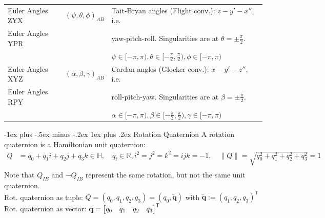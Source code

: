\documentclass[10pt,landscape,a4paper]{article}
\makeatletter
\renewcommand{\subsubsection}{\@startsection{subsubsection}{3}{0mm}%
                                {-1ex plus -.5ex minus -.2ex}%
                                {1ex plus .2ex}%
                                {\normalfont\small\bfseries}}
\newcommand\norm[1]{\lVert #1 \rVert}
\newcommand\transpose{\mathsf{T}}
\newcommand\imquatvec[1]{\check{\mathbf{#1}}}
\newcommand\Quat[2]{Q_{#1\!#2}}
\makeatother
\begin{document}
\begin{multicols}{2}
\begin{tabular}{ll@{}l@{}}
Euler Angles ZYX &  $(\psi, \theta, \phi)_{A\!B}$  & Tait-Bryan angles (Flight conv.): $z-y'-x''$, i.e.\   \\
Euler Angles YPR &  & yaw-pitch-roll. Singularities are at $\theta=\pm\frac{\pi}{2}$. \\
 &  & $\psi\in[-\pi,\pi), \theta\in[-\frac{\pi}{2},\frac{\pi}{2}), \phi\in[-\pi,\pi)$  \\  \hline
Euler Angles XYZ &  $(\alpha, \beta, \gamma)_{A\!B}$ & Cardan angles (Glocker conv.): $x-y'-z''$, i.e.\ \\
Euler Angles RPY & & roll-pitch-yaw. Singularities are at $\beta=\pm\frac{\pi}{2}$.  \\
 &  & $\alpha\in[-\pi,\pi), \beta\in[-\frac{\pi}{2},\frac{\pi}{2}), \gamma\in[-\pi,\pi)$  \\  \hline
\end{tabular} %

\subsubsection{Rotation Quaternion}
A rotation quaternion is a Hamiltonian unit quaternion: \\
$\begin{aligned}Q &= q_0 + q_1 i + q_2 j + q_3 k \in \mathbb{H}, \quad q_i \in \mathbb{R}, 
i^2 = j^2=k^2 = ijk = -1, \quad \norm{Q}= \sqrt{q_0^2 + q_1^2 + q_2^2 + q_3^2} = 1 \\
\end{aligned}$   \\
Note that $\Quat{I}{B}$ and $-\Quat{I}{B}$ represent the same rotation, but not the same unit quaternion. \\
Rot. quaternion as tuple: $Q = (q_0, q_1, q_2, q_3) = (q_0, \imquatvec{q})$ with $\imquatvec{q} := (q_1, q_2, q_3)^\transpose $ \\
Rot. quaternion as vector: $\vq = \begin{bmatrix} q_0 & q_1 & q_2 & q_3 \end{bmatrix}^\transpose $\\



\end{multicols}
\end{document}
